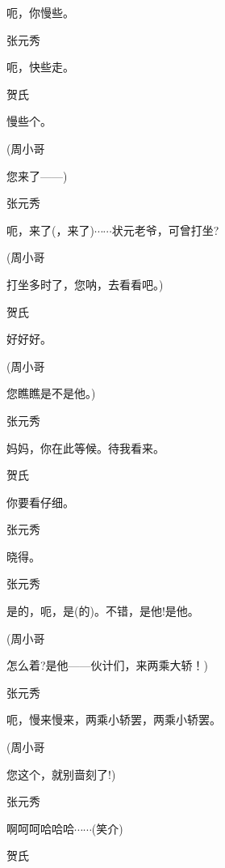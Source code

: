 呃，你慢些。

张元秀\hspace{20pt}~

呃，快些走。

贺氏\hspace{30pt}~

慢些个。

(周小哥\hspace{20pt}~

您来了------)

张元秀\hspace{20pt}~

呃，来了(，来了)$\cdots{}\cdots{}$状元老爷，可曾打坐?

(周小哥\hspace{20pt}~

打坐多时了，您呐，去看看吧。)

贺氏\hspace{30pt}~

好好好。

(周小哥\hspace{20pt}~

您瞧瞧是不是他。)

张元秀\hspace{20pt}~

妈妈，你在此等候。待我看来。

贺氏\hspace{30pt}~

你要看仔细。

张元秀\hspace{20pt}~

晓得。

张元秀\hspace{20pt}~

是的，呃，是(的)。不错，是他!是他。

(周小哥\hspace{20pt}~

怎么着?是他------伙计们，来两乘大轿！)

张元秀\hspace{20pt}~

呃，慢来慢来，两乘小轿罢，两乘小轿罢。

(周小哥\hspace{20pt}~

您这个，就别啬刻了!)

张元秀\hspace{20pt}~

啊呵呵哈哈哈$\cdots{}\cdots{}$(笑介)

贺氏\hspace{30pt}~

